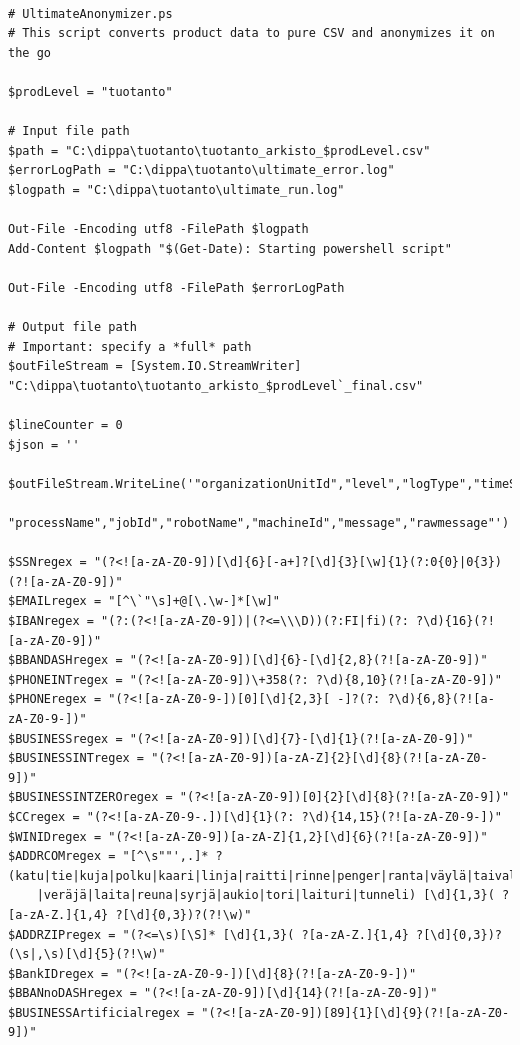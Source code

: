 \begin{Verbatim}[fontsize=\tiny]

# UltimateAnonymizer.ps
# This script converts product data to pure CSV and anonymizes it on the go

$prodLevel = "tuotanto"

# Input file path
$path = "C:\dippa\tuotanto\tuotanto_arkisto_$prodLevel.csv"
$errorLogPath = "C:\dippa\tuotanto\ultimate_error.log"
$logpath = "C:\dippa\tuotanto\ultimate_run.log"

Out-File -Encoding utf8 -FilePath $logpath
Add-Content $logpath "$(Get-Date): Starting powershell script"

Out-File -Encoding utf8 -FilePath $errorLogPath

# Output file path
# Important: specify a *full* path
$outFileStream = [System.IO.StreamWriter] "C:\dippa\tuotanto\tuotanto_arkisto_$prodLevel`_final.csv"

$lineCounter = 0
$json = ''

$outFileStream.WriteLine('"organizationUnitId","level","logType","timeStamp","fingerprint","machineName",
    "processName","jobId","robotName","machineId","message","rawmessage"')

$SSNregex = "(?<![a-zA-Z0-9])[\d]{6}[-a+]?[\d]{3}[\w]{1}(?:0{0}|0{3})(?![a-zA-Z0-9])"
$EMAILregex = "[^\`"\s]+@[\.\w-]*[\w]"
$IBANregex = "(?:(?<![a-zA-Z0-9])|(?<=\\\D))(?:FI|fi)(?: ?\d){16}(?![a-zA-Z0-9])"
$BBANDASHregex = "(?<![a-zA-Z0-9])[\d]{6}-[\d]{2,8}(?![a-zA-Z0-9])"
$PHONEINTregex = "(?<![a-zA-Z0-9])\+358(?: ?\d){8,10}(?![a-zA-Z0-9])"
$PHONEregex = "(?<![a-zA-Z0-9-])[0][\d]{2,3}[ -]?(?: ?\d){6,8}(?![a-zA-Z0-9-])"
$BUSINESSregex = "(?<![a-zA-Z0-9])[\d]{7}-[\d]{1}(?![a-zA-Z0-9])"
$BUSINESSINTregex = "(?<![a-zA-Z0-9])[a-zA-Z]{2}[\d]{8}(?![a-zA-Z0-9])"
$BUSINESSINTZEROregex = "(?<![a-zA-Z0-9])[0]{2}[\d]{8}(?![a-zA-Z0-9])"
$CCregex = "(?<![a-zA-Z0-9-.])[\d]{1}(?: ?\d){14,15}(?![a-zA-Z0-9-])"
$WINIDregex = "(?<![a-zA-Z0-9])[a-zA-Z]{1,2}[\d]{6}(?![a-zA-Z0-9])"
$ADDRCOMregex = "[^\s""',.]* ?(katu|tie|kuja|polku|kaari|linja|raitti|rinne|penger|ranta|väylä|taival|tanhua|portti
    |veräjä|laita|reuna|syrjä|aukio|tori|laituri|tunneli) [\d]{1,3}( ?[a-zA-Z.]{1,4} ?[\d]{0,3})?(?!\w)"
$ADDRZIPregex = "(?<=\s)[\S]* [\d]{1,3}( ?[a-zA-Z.]{1,4} ?[\d]{0,3})?(\s|,\s)[\d]{5}(?!\w)"
$BankIDregex = "(?<![a-zA-Z0-9-])[\d]{8}(?![a-zA-Z0-9-])"
$BBANnoDASHregex = "(?<![a-zA-Z0-9])[\d]{14}(?![a-zA-Z0-9])"
$BUSINESSArtificialregex = "(?<![a-zA-Z0-9])[89]{1}[\d]{9}(?![a-zA-Z0-9])"


\end{Verbatim}
